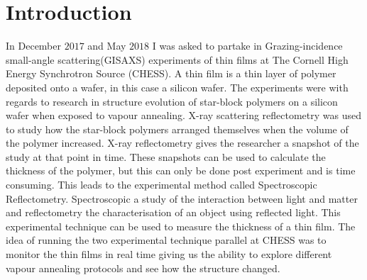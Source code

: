 \documentclass[MasterThesisMain.tex]{subfiles}
\begin{document}
	\chapter{Introduction}
	
In December $2017$ and May $2018$ I was asked to partake in Grazing-incidence small-angle scattering(GISAXS) experiments of thin films at The Cornell High Energy Synchrotron Source (CHESS). A thin film is a thin layer of polymer deposited onto a wafer, in this case a silicon wafer. The experiments were with regards to research in structure evolution of star-block polymers on a silicon wafer when exposed to vapour annealing. X-ray scattering reflectometry was used to study how the star-block polymers arranged themselves when the volume of the polymer increased. X-ray reflectometry gives the researcher a snapshot of the study at that point in time. These snapshots can be used to calculate the thickness of the polymer, but this can only be done post experiment and is time consuming. This leads to the experimental method called Spectroscopic Reflectometry. Spectroscopic a study of the interaction between light and matter and reflectometry the characterisation of an object using reflected light. This experimental technique can be used to measure the thickness of a thin film. The idea of running the two experimental technique parallel at CHESS was to monitor the thin films in real time giving us the ability to explore different vapour annealing protocols and see how the structure changed.          
\end{document}
